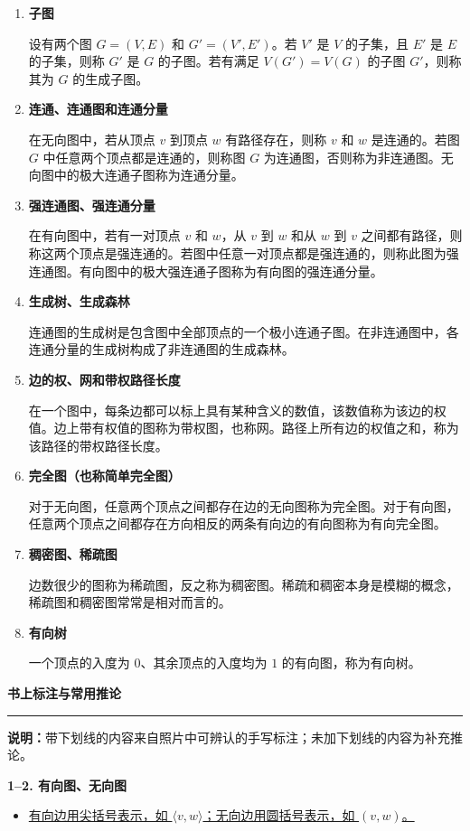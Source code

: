 \documentclass[UTF8,10pt,fontset=mac]{ctexart}
\newcommand{\defitem}[2]{\item \textbf{#1}\nopagebreak\par #2}
\begin{document}
\begin{enumerate}
\defitem{子图}{
设有两个图 $G=(V,E)$ 和 $G'=(V',E')$。若 $V'$ 是 $V$ 的子集，且 $E'$ 是 $E$ 的子集，则称 $G'$ 是 $G$ 的子图。若有满足 $V(G')=V(G)$ 的子图 $G'$，则称其为 $G$ 的生成子图。
}

\defitem{连通、连通图和连通分量}{
在无向图中，若从顶点 $v$ 到顶点 $w$ 有路径存在，则称 $v$ 和 $w$ 是连通的。若图 $G$ 中任意两个顶点都是连通的，则称图 $G$ 为连通图，否则称为非连通图。无向图中的极大连通子图称为连通分量。
}

\defitem{强连通图、强连通分量}{
在有向图中，若有一对顶点 $v$ 和 $w$，从 $v$ 到 $w$ 和从 $w$ 到 $v$ 之间都有路径，则称这两个顶点是强连通的。若图中任意一对顶点都是强连通的，则称此图为强连通图。有向图中的极大强连通子图称为有向图的强连通分量。
}

\defitem{生成树、生成森林}{
连通图的生成树是包含图中全部顶点的一个极小连通子图。在非连通图中，各连通分量的生成树构成了非连通图的生成森林。
}

\defitem{边的权、网和带权路径长度}{
在一个图中，每条边都可以标上具有某种含义的数值，该数值称为该边的权值。边上带有权值的图称为带权图，也称网。路径上所有边的权值之和，称为该路径的带权路径长度。
}

\defitem{完全图（也称简单完全图）}{
对于无向图，任意两个顶点之间都存在边的无向图称为完全图。对于有向图，任意两个顶点之间都存在方向相反的两条有向边的有向图称为有向完全图。
}

\defitem{稠密图、稀疏图}{
边数很少的图称为稀疏图，反之称为稠密图。稀疏和稠密本身是模糊的概念，稀疏图和稠密图常常是相对而言的。
}

\defitem{有向树}{
一个顶点的入度为 $0$、其余顶点的入度均为 $1$ 的有向图，称为有向树。
}

\end{enumerate}

\newpage

\begin{center}
  {\bfseries\Large 书上标注与常用推论}
\end{center}
\vspace{-3pt}
\hrule
\vspace{5pt}

\noindent\textbf{说明：}带下划线的内容来自照片中可辨认的手写标注；未加下划线的内容为补充推论。

\vspace{3pt}
\noindent\textbf{1--2. 有向图、无向图}
\begin{itemize}[leftmargin=1.8em,itemsep=1.2pt,topsep=1pt]
  \item \uline{有向边用尖括号表示，如 $\langle v,w\rangle$；无向边用圆括号表示，如 $(v,w)$。}
\end{itemize}
\end{document}
